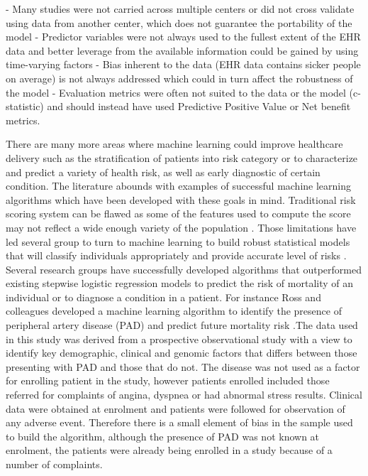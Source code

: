 -	Many studies were not carried across multiple centers or did not cross validate using data from another center, which does not guarantee the portability of the model 
-	Predictor variables were not always used to the fullest extent of the EHR data and better leverage from the available information could be gained by using time-varying factors
-	Bias inherent to the data (EHR data contains sicker people on average) is not always addressed which could in turn affect the robustness of the model
-	Evaluation metrics were often not suited to the data or the model (c-statistic) and should instead have used Predictive Positive Value or Net benefit metrics.

There are many more areas where machine learning could improve healthcare delivery such as the stratification of patients into risk category or to characterize and predict a variety of health risk, as well as early diagnostic of certain condition. The literature abounds with examples of successful machine learning algorithms which have been developed with these goals in mind. \newline 
Traditional risk scoring system can be flawed as some of the features used to compute the score may not reflect a wide enough variety of the population \citep{Besseling:2017bs}. Those limitations have led several group to turn to machine learning to build robust statistical models that will classify individuals appropriately and provide accurate level of risks \citep{Callahan:2017bz, Besseling:2017bs}.\newline
 Several research groups have successfully developed algorithms that outperformed existing stepwise logistic regression models to predict the risk of mortality of an individual or to diagnose a condition in a patient. For instance  Ross and colleagues developed a machine learning algorithm to identify the presence of peripheral artery disease (PAD) and predict future mortality risk \citep{Ross:2016kh}.The data used in this study was derived from a prospective observational study with a view to identify key demographic, clinical and genomic factors that differs between those presenting with PAD and those that do not. The disease was not used as a factor for enrolling patient in the study, however patients enrolled included those referred for complaints of angina, dyspnea or had abnormal stress results. Clinical data were obtained at enrolment and patients were followed for observation of any adverse event. Therefore there is a small element of bias in the sample used to build the algorithm, although the presence of PAD was not known at enrolment, the patients were already being enrolled in a study because of a number of complaints. \newline
